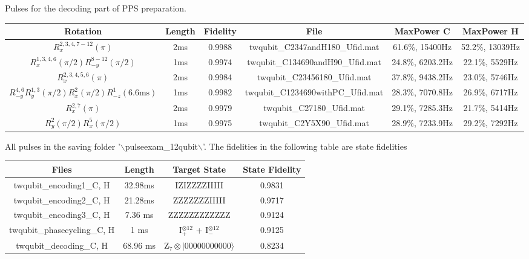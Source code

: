 \documentclass[prl,onecolumn]{revtex4-1}
\newcommand{\ket}[1]{|#1\rangle}
\newcommand{\dir}{$\backslash$}
\begin{document}
Pulses for the decoding part of PPS preparation.
\begin{table}[!h]
\begin{tabular} {c||c|c|c|c|c}
  \hline
  Rotation & Length & Fidelity & File & MaxPower C & MaxPower H\\
  \hline
  $R_x^{2,3,4,7-12}(\pi)$ & 2ms & 0.9988 & twqubit\_C2347andH180\_Ufid.mat & 61.6\%, 15400Hz & 52.2\%, 13039Hz\\
  $R_x^{1,3,4,6}(\pi/2)R_{-y}^{8-12}(\pi/2)$ & 1ms & 0.9974 & twqubit\_C134690andH90\_Ufid.mat & 24.8\%, 6203.2Hz & 22.1\%, 5529Hz\\
  $R_x^{2,3,4,5,6}(\pi)$ & 2ms & 0.9984 & twqubit\_C23456180\_Ufid.mat & 37.8\%, 9438.2Hz & 23.0\%, 5746Hz\\
  $R_{-y}^{4,6}R_{y}^{1,3}(\pi/2)R_{x}^{2}(\pi/2)R_{-z}^{1}(6.6\text{ms})$ & 1ms & 0.9982 &  twqubit\_C1234690withPC\_Ufid.mat & 28.3\%, 7070.8Hz & 26.9\%, 6717Hz\\
  $R_x^{2,7}(\pi)$ & 2ms & 0.9979 & twqubit\_C27180\_Ufid.mat & 29.1\%, 7285.3Hz & 21.7\%, 5414Hz\\
  $R_{y}^{2}(\pi/2)R_{x}^{5}(\pi/2)$ & 1ms & 0.9975 & twqubit\_C2Y5X90\_Ufid.mat & 28.9\%, 7233.9Hz & 29.2\%, 7292Hz\\
  \hline
\end{tabular}
\end{table}

\newpage
All pulses in the saving folder '\dir pulseexam\_12qubit\dir'. The fidelities in the following table are state fidelities
\begin{table}[!h]
\begin{tabular} {c||c|c|c}
  \hline
  Files & Length & Target State & State Fidelity\\
  \hline
  twqubit\_encoding1\_C, H & 32.98ms & IZIZZZZIIIII & 0.9831\\
  twqubit\_encoding2\_C, H & 21.28ms & ZZZZZZZIIIII & 0.9717\\
  twqubit\_encoding3\_C, H & 7.36 ms & ZZZZZZZZZZZZ & 0.9124\\
  twqubit\_phasecycling\_C, H & 1 ms & I$_{+}^{\otimes 12}$ + I$_{-}^{\otimes 12}$ & 0.9125\\
  twqubit\_decoding\_C, H & 68.96 ms & Z$_7\otimes\ket{00000000000}$ & 0.8234\\
  \hline
\end{tabular}
\end{table}

\begin{thebibliography}{99}

\end{thebibliography}
\end{document}
